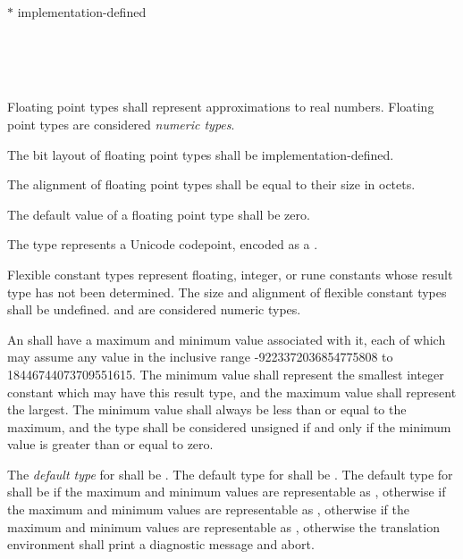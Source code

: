 $\ast$ implementation-defined


\begin{grammar}
 \\
	 \\
	 \\
\end{grammar}

\specsubsubitem
Floating point types shall represent approximations to real numbers. Floating
point types are considered \textit{numeric types}.

\specsubsubitem
The bit layout of floating point types shall be implementation-defined.

\specsubsubitem
The alignment of floating point types shall be equal to their size in octets.

\specsubsubitem
The default value of a floating point type shall be zero.


\specsubsubitem
The  type represents a Unicode codepoint, encoded as a
.


\specsubsubitem
Flexible constant types represent floating, integer, or rune constants whose
result type has not been determined. The size and alignment of flexible constant
types shall be undefined.  and  are considered
numeric types.

\specsubsubitem
An  shall have a maximum and minimum value associated with it,
each of which may assume any value in the inclusive range -9223372036854775808
to 18446744073709551615. The minimum value shall represent the smallest integer
constant which may have this result type, and the maximum value shall represent
the largest. The minimum value shall always be less than or equal to the
maximum, and the type shall be considered unsigned if and only if the minimum
value is greater than or equal to zero.

\specsubsubitem
The \textit{default type} for  shall be . The
default type for  shall be . The default type
for  shall be  if the maximum and minimum values
are representable as , otherwise  if the maximum and
minimum values are representable as , otherwise  if
the maximum and minimum values are representable as , otherwise
the translation environment shall print a diagnostic message and abort.


